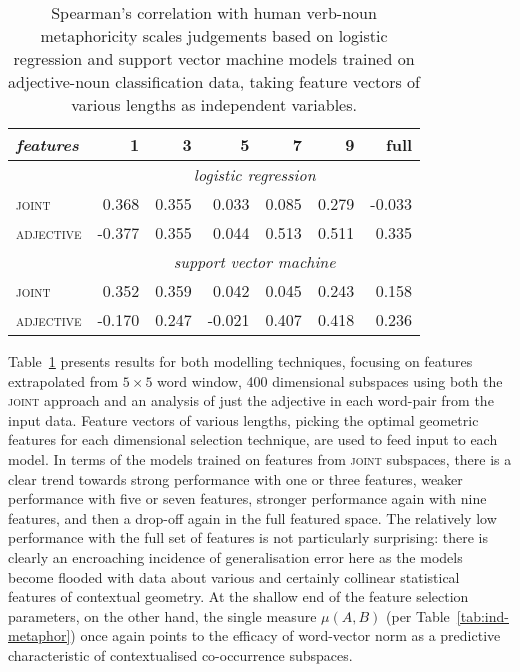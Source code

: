 \begin{table}
\centering
\begin{tabular}{lrrrrrr}
\hline
\emph{features} & 1 & 3 & 5 & 7 & 9 & full \\
\hline
& \multicolumn{6}{c}{\emph{logistic regression}} \\
\textsc{joint} & 0.368 & 0.355 & 0.033 & 0.085 & 0.279 & -0.033 \\
\textsc{adjective} & -0.377 & 0.355 & 0.044 & 0.513 & 0.511 & 0.335 \\
\hline
& \multicolumn{6}{c}{\emph{support vector machine}} \\
\textsc{joint} & 0.352 & 0.359 & 0.042 & 0.045 & 0.243 & 0.158 \\
\textsc{adjective} & -0.170 & 0.247 & -0.021 & 0.407 & 0.418 & 0.236 \\
\hline
\end{tabular}
\caption[Scoring Metaphoricity Based On Classification Data]{Spearman's correlation with human verb-noun metaphoricity scales judgements based on logistic regression and support vector machine models trained on adjective-noun classification data, taking feature vectors of various lengths as independent variables.}
\label{tab:verblearn}
\end{table}

Table~\ref{tab:verblearn} presents results for both modelling techniques, focusing on features extrapolated from $5 \times 5$ word window, 400 dimensional subspaces using both the \textsc{joint} approach and an analysis of just the adjective in each word-pair from the input data.  Feature vectors of various lengths, picking the optimal geometric features for each dimensional selection technique, are used to feed input to each model.  In terms of the models trained on features from \textsc{joint} subspaces, there is a clear trend towards strong performance with one or three features, weaker performance with five or seven features, stronger performance again with nine features, and then a drop-off again in the full featured space.  The relatively low performance with the full set of features is not particularly surprising: there is clearly an encroaching incidence of generalisation error here as the models become flooded with data about various and certainly collinear statistical features of contextual geometry.  At the shallow end of the feature selection parameters, on the other hand, the single measure $\mu(A,B)$ (per Table~\ref{tab:ind-metaphor}) once again points to the efficacy of word-vector norm as a predictive characteristic of contextualised co-occurrence subspaces.

